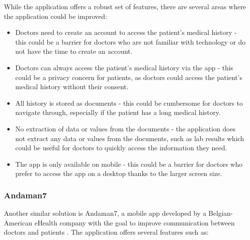 While the application offers a robust set of features, there are several areas where the application could be improved:
\begin{itemize}
    \item Doctors need to create an account to access the patient's medical history - this could be a barrier for doctors who are not familiar with technology or do not have the time to create an account.
    \item Doctors can always access the patient's medical history via the app - this could be a privacy concern for patients, as doctors could access the patient's medical history without their consent.
    \item All history is stored as documents - this could be cumbersome for doctors to navigate through, especially if the patient has a long medical history.
    \item No extraction of data or values from the documents - the application does not extract any data or values from the documents, such as lab results which could be useful for doctors to quickly access the information they need.
    \item The app is only available on mobile - this could be a barrier for doctors who prefer to access the app on a desktop thanks to the larger screen size.
\end{itemize}

\subsubsection{Andaman7}

Another similar solution is Andaman7, a mobile app developed by a Belgian-American eHealth company with the goal to improve communication between doctors and patients \parencite{andaman}. The application offers several features such as:

